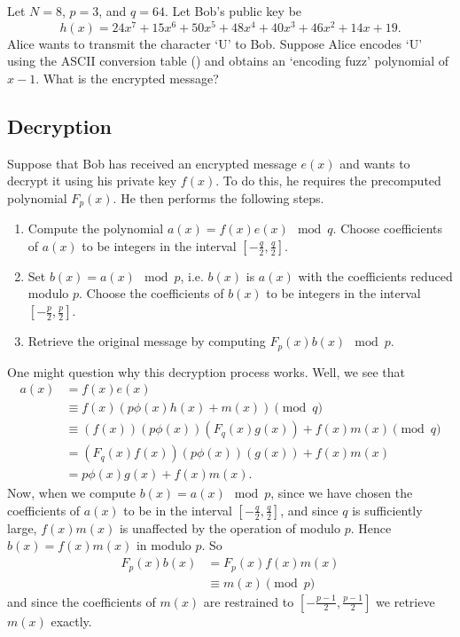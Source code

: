 \begin{exercise}
    Let $N = 8$, $p = 3$, and $q = 64$. Let Bob's public key be
    \[
        h(x) = 24x^7 + 15x^6 + 50x^5 + 48x^4 + 40x^3 + 46x^2 + 14x + 19.
    \]
    Alice wants to transmit the character `U' to Bob. Suppose Alice encodes `U' using the ASCII conversion table () and obtains an `encoding fuzz' polynomial of $x - 1$. What is the encrypted message?
\end{exercise}

\subsection{Decryption}
Suppose that Bob has received an encrypted message $e(x)$ and wants to decrypt it using his private key $f(x)$. To do this, he requires the precomputed polynomial $F_p(x)$. He then performs the following steps.
\begin{enumerate}
    \item Compute the polynomial $a(x) = f(x)e(x) \mod q$. Choose coefficients of $a(x)$ to be integers in the interval $\left[-\frac q2, \frac q2\right]$.
    \item Set $b(x) = a(x) \mod p$, i.e. $b(x)$ is $a(x)$ with the coefficients reduced modulo $p$. Choose the coefficients of $b(x)$ to be integers in the interval $\left[-\frac p2, \frac p2\right]$.
    \item Retrieve the original message by computing $F_p(x)b(x) \mod p$.
\end{enumerate}

One might question why this decryption process works. Well, we see that
\begin{align*}
    a(x) &= f(x)e(x)\\
    &\equiv f(x) \left(p\phi(x)h(x) + m(x)\right) \pmod q\\
    &\equiv (f(x))(p\phi(x))(F_q(x)g(x)) + f(x)m(x) \pmod q\\
    &= (F_q(x)f(x))(p\phi(x))(g(x)) + f(x)m(x)\\
    &= p\phi(x)g(x) + f(x)m(x).
\end{align*}
Now, when we compute $b(x) = a(x) \mod p$, since we have chosen the coefficients of $a(x)$ to be in the interval $\left[-\frac q2, \frac q2\right]$, and since $q$ is sufficiently large, $f(x)m(x)$ is unaffected by the operation of modulo $p$. Hence $b(x) = f(x)m(x)$ in modulo $p$. So
\begin{align*}
    F_p(x)b(x) &= F_p(x)f(x)m(x)\\
    &\equiv m(x) \pmod{p}
\end{align*}
and since the coefficients of $m(x)$ are restrained to $\left[-\frac{p-1}2, \frac{p-1}2\right]$ we retrieve $m(x)$ exactly.

